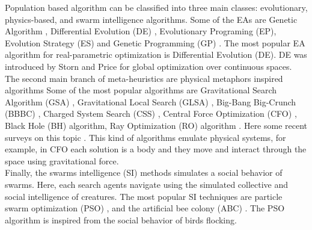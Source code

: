 \documentclass[conference]{IEEEtran}
\begin{document}
Population based algorithm can be classified into three main classes:
evolutionary, physics-based, and swarm intelligence algorithms.
Some of the EAs are Genetic Algorithm \cite{melanie96}, Differential Evolution 
(DE) \cite{ed1995}, Evolutionary Programing (EP), Evolution Strategy (ES) and 
Genetic Programming (GP) \cite{back,spall03}.
%
The most popular EA algorithm for real-parametric optimization is Differential 
Evolution (DE). DE was introduced by Storn and Price \cite{ed1995}  for global 
optimization over continuous spaces.\\
%

The second main branch of meta-heuristics are physical metaphors inspired algorithms
Some of the most popular algorithms are Gravitational  Search Algorithm (GSA) 
\cite{rashedi2009gsa}, Gravitational Local Search (GLSA) \cite{glsa}, Big-Bang 
Big-Crunch (BBBC) \cite{erol2006new}, Charged System Search (CSS) \cite{kaveh2010novel}, 
Central Force Optimization (CFO) \cite{cfo2007}, Black Hole (BH) \cite{hatamlou2013black} 
algorithm, Ray Optimization (RO) algorithm \cite{kaveh2012new}. Here some recent 
surveys on this topic \cite{fisicaSurvey,biswas2013physics,xie2011convergence,DBLP:journals/corr/FisterYFBF13}. 
This kind of algorithms emulate physical systems, for example, in CFO each solution 
is a body and they move and interact through the space using gravitational force.\\
% 

Finally, the swarms intelligence (SI) methods simulates a social behavior of 
swarms. Here, each search agents navigate using the simulated collective and 
social intelligence  of creatures. The most popular SI techniques are particle 
swarm optimization (PSO)  \cite{pso1995}, and the artificial bee colony (ABC) 
\cite{abc2005}. The PSO algorithm  is inspired from the social behavior of birds 
flocking.\\
\end{document}
